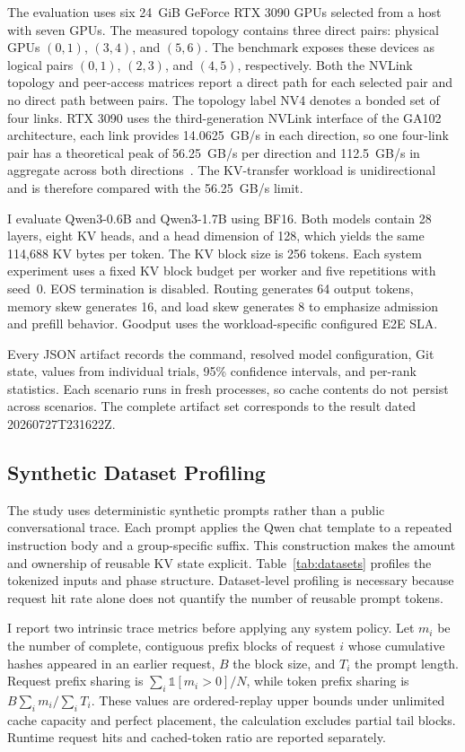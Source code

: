 \documentclass{article}
\begin{document}
The evaluation uses six 24~GiB GeForce RTX 3090 GPUs selected from a host with seven GPUs. The measured topology contains three direct pairs: physical GPUs $(0,1)$, $(3,4)$, and $(5,6)$. The benchmark exposes these devices as logical pairs $(0,1)$, $(2,3)$, and $(4,5)$, respectively. Both the NVLink topology and peer-access matrices report a direct path for each selected pair and no direct path between pairs. The topology label NV4 denotes a bonded set of four links. RTX 3090 uses the third-generation NVLink interface of the GA102 architecture, each link provides 14.0625~GB/s in each direction, so one four-link pair has a theoretical peak of 56.25~GB/s per direction and 112.5~GB/s in aggregate across both directions~\citep{NVIDIAAmpereGA102}. The KV-transfer workload is unidirectional and is therefore compared with the 56.25~GB/s limit.

I evaluate Qwen3-0.6B and Qwen3-1.7B using BF16. Both models contain 28 layers, eight KV heads, and a head dimension of 128, which yields the same 114,688 KV bytes per token. The KV block size is 256 tokens. Each system experiment uses a fixed KV block budget per worker and five repetitions with seed~0. EOS termination is disabled. Routing generates 64 output tokens, memory skew generates 16, and load skew generates 8 to emphasize admission and prefill behavior. Goodput uses the workload-specific configured E2E SLA.

Every JSON artifact records the command, resolved model configuration, Git state, values from individual trials, 95\% confidence intervals, and per-rank statistics. Each scenario runs in fresh processes, so cache contents do not persist across scenarios. The complete artifact set corresponds to the result dated 20260727T231622Z.

\subsection{Synthetic Dataset Profiling}

The study uses deterministic synthetic prompts rather than a public conversational trace. Each prompt applies the Qwen chat template to a repeated instruction body and a group-specific suffix. This construction makes the amount and ownership of reusable KV state explicit. Table~\ref{tab:datasets} profiles the tokenized inputs and phase structure. Dataset-level profiling is necessary because request hit rate alone does not quantify the number of reusable prompt tokens.

I report two intrinsic trace metrics before applying any system policy. Let $m_i$ be the number of complete, contiguous prefix blocks of request $i$ whose cumulative hashes appeared in an earlier request, $B$ the block size, and $T_i$ the prompt length. Request prefix sharing is $\sum_i \mathbb{1}[m_i>0]/N$, while token prefix sharing is $B\sum_i m_i/\sum_i T_i$. These values are ordered-replay upper bounds under unlimited cache capacity and perfect placement, the calculation excludes partial tail blocks. Runtime request hits and cached-token ratio are reported separately.
\end{document}
